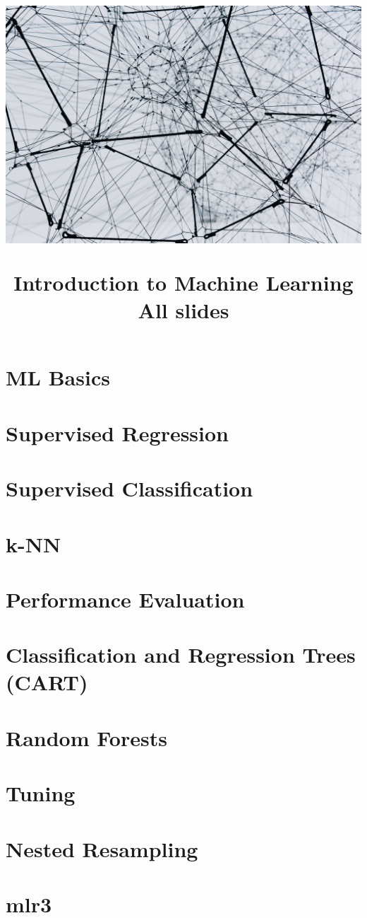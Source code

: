 \documentclass[11pt,compress]{beamer}
\title{
\hspace{-0.5cm}\centerline{\includegraphics[width=1.05\paperwidth,keepaspectratio, trim={0 15cm 0 5cm}, clip]{titlepage.jpg}}
\medskip
Introduction to Machine Learning \\
\medskip
\small All slides
\vspace{-1.5cm}
}
\begin{document}

\begin{frame}
\maketitle
\end{frame}



\section{ML Basics}


\section{Supervised Regression}


\section{Supervised Classification}


\section{k-NN}


\section{Performance Evaluation}


\section{Classification and Regression Trees (CART)}


\section{Random Forests}


\section{Tuning}


\section{Nested Resampling}


\section{mlr3}

\end{document}

